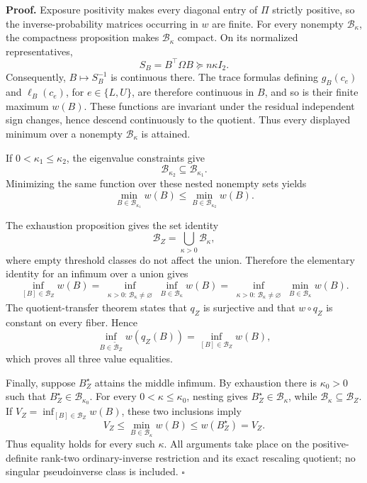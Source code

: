 \textbf{Proof.}
Exposure positivity makes every diagonal entry of \(\Pi\) strictly positive, so the inverse-probability matrices occurring in \(w\) are finite.  For every nonempty \(\mathcal B_\kappa\), the compactness proposition makes \(\mathcal B_\kappa\) compact.  On its normalized representatives,
\[
 S_B=B^{\top}\Omega B\succeq n\kappa I_2.
\]
Consequently, \(B\mapsto S_B^{-1}\) is continuous there.  The trace formulas defining \(g_B(c_e)\) and \(\ell_B(c_e)\), for \(e\in\{L,U\}\), are therefore continuous in \(B\), and so is their finite maximum \(w(B)\).  These functions are invariant under the residual independent sign changes, hence descend continuously to the quotient.  Thus every displayed minimum over a nonempty \(\mathcal B_\kappa\) is attained.

If \(0<\kappa_1\le\kappa_2\), the eigenvalue constraints give
\[
 \mathcal B_{\kappa_2}\subseteq\mathcal B_{\kappa_1}.
\]
Minimizing the same function over these nested nonempty sets yields
\[
 \min_{B\in\mathcal B_{\kappa_1}}w(B)
 \le
 \min_{B\in\mathcal B_{\kappa_2}}w(B).
\]

The exhaustion proposition gives the set identity
\[
 \mathcal B_Z=\bigcup_{\kappa>0}\mathcal B_\kappa,
\]
where empty threshold classes do not affect the union.  Therefore the elementary identity for an infimum over a union gives
\[
 \inf_{[B]\in\mathcal B_Z}w(B)
 =
 \inf_{\substack{\kappa>0:\,\mathcal B_\kappa\ne\varnothing}}
 \inf_{B\in\mathcal B_\kappa}w(B)
 =
 \inf_{\substack{\kappa>0:\,\mathcal B_\kappa\ne\varnothing}}
 \min_{B\in\mathcal B_\kappa}w(B).
\tag{1}
\]
The quotient-transfer theorem states that \(q_Z\) is surjective and that \(w\circ q_Z\) is constant on every fiber.  Hence
\[
 \inf_{B\in\widetilde{\mathcal B}_Z}w(q_Z(B))
 =\inf_{[B]\in\mathcal B_Z}w(B),
\tag{2}
\]
which proves all three value equalities.

Finally, suppose \(B_Z^\star\) attains the middle infimum.  By exhaustion there is \(\kappa_0>0\) such that \(B_Z^\star\in\mathcal B_{\kappa_0}\).  For every \(0<\kappa\le\kappa_0\), nesting gives \(B_Z^\star\in\mathcal B_\kappa\), while \(\mathcal B_\kappa\subseteq\mathcal B_Z\).  If \(V_Z=\inf_{[B]\in\mathcal B_Z}w(B)\), these two inclusions imply
\[
 V_Z
 \le \min_{B\in\mathcal B_\kappa}w(B)
 \le w(B_Z^\star)
 =V_Z.
\]
Thus equality holds for every such \(\kappa\).  All arguments take place on the positive-definite rank-two ordinary-inverse restriction and its exact rescaling quotient; no singular pseudoinverse class is included. \(\square\)